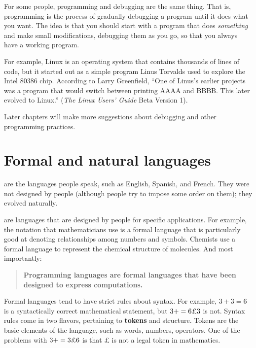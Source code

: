 For some people, programming and debugging are the same thing.  That
is, programming is the process of gradually debugging a program until
it does what you want.  The idea is that you should start with a
program that does {\em something} and make small modifications,
debugging them as you go, so that you always have a working program.

For example, Linux is an operating system that contains thousands of
lines of code, but it started out as a simple program Linus Torvalds
used to explore the Intel 80386 chip.  According to Larry Greenfield,
``One of Linus's earlier projects was a program that would switch
between printing AAAA and BBBB.  This later evolved to Linux.''
({\em The Linux Users' Guide} Beta Version 1).


Later chapters will make more suggestions about debugging and other
programming practices.

\section{Formal and natural languages}

\begin{definition} are the languages people speak,
such as English, Spanish, and French.  They were not designed
by people (although people try to impose some order on them);
they evolved naturally.
\end{definition}

\begin{definition} are languages that are designed by people for
specific applications.  For example, the notation that mathematicians
use is a formal language that is particularly good at denoting
relationships among numbers and symbols.  Chemists use a formal
language to represent the chemical structure of molecules.  And
most importantly:
\end{definition}

\begin{quote}
	{\bf Programming languages are formal languages that have been
		designed to express computations.}
\end{quote}

Formal languages tend to have strict rules about syntax.  For example,
$3 + 3 = 6$ is a syntactically correct mathematical statement, but 
$3 + = 6 \mbox{\pounds} 3$ is not. 
Syntax rules come in two flavors, pertaining to {\bf tokens} and
structure.  Tokens are the basic elements of the language, such as
words, numbers, operators.  One of the problems with $3 +
= 3 \mbox{\pounds} 6$ is that $\pounds$ is not a legal token in mathematics.

